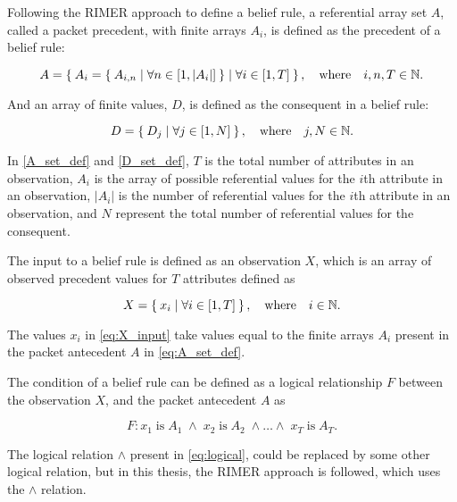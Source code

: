 Following the RIMER approach \cite{rimer2006} to define a belief rule,
a referential array set $A$, called a packet precedent, with finite arrays $A_i$, is defined as the precedent of a 
belief rule:

\begin{equation}
\label{eq:A_set_def}
    A = \Set{ A_i = \Set{A_{i, n} \mid \forall n \in \left[1, \left|A_i\right| \right]}
    \mid \forall i \in \left[1, T \right] }, \quad\text{where}\quad i, n, T \in \mathbb{N}.
\end{equation}

And an array of finite values, $D$, is defined as the consequent in a belief rule:

\begin{equation}
\label{D_set_def}
    D = \Set{D_j \mid \forall j \in \left[1, N \right] }, \quad\text{where}\quad j, N \in \mathbb{N}.
\end{equation}

In \eqref{A_set_def} and \eqref{D_set_def}, $T$ is the total number of attributes in an observation, $A_i$ is the array of possible  referential values
for the $i$th attribute in an observation, $\left|A_i\right|$ is the number of referential values for the $i$th attribute in an observation,
and $N$ represent the total number of referential values for the consequent.

The input to a belief rule is defined as an observation $X$, which is an array of observed precedent values
for $T$ attributes defined as

\begin{equation}
    \label{eq:X_input}
    X = \Set{ x_i \mid \forall i \in \left[1, T \right]}, \quad\text{where}\quad i \in \mathbb{N}.
\end{equation}

The values $x_i$ in \eqref{eq:X_input} take values equal to the finite arrays $A_i$ present in the packet
antecedent $A$ in \eqref{eq:A_set_def}.

The condition of a belief rule can be defined as a logical relationship $F$ between the observation $X$, and
the packet antecedent $A$ as

\begin{equation}
    \label{eq:logical}
    F : x_1\;\text{is}\;A_1\;\land\;x_2\;\text{is}\;A_2\;\land\dots\land\;x_T\;\text{is}\;A_T.
\end{equation}

The logical relation $\land$ present in \eqref{eq:logical}, could be replaced by some other logical relation, but in this thesis,
the RIMER approach is followed, which uses the $\land$ relation.

